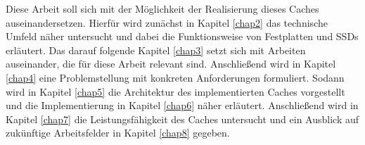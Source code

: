 Diese Arbeit soll sich mit der Möglichkeit der Realisierung dieses Caches auseinandersetzen. Hierfür wird zunächst in Kapitel \ref{chap2} das technische Umfeld
näher untersucht und dabei die Funktionsweise von Festplatten und \acp{SSD} erläutert. Das darauf folgende Kapitel \ref {chap3} setzt sich mit Arbeiten
auseinander, die für diese Arbeit relevant sind. Anschließend wird in Kapitel \ref{chap4} eine Problemstellung mit konkreten Anforderungen formuliert. Sodann
wird in Kapitel \ref{chap5} die Architektur des implementierten Caches vorgestellt und die Implementierung in Kapitel \ref{chap6} näher erläutert. Anschließend
wird in Kapitel \ref{chap7} die Leistungsfähigkeit des Caches untersucht und ein Ausblick auf zukünftige Arbeitsfelder in Kapitel \ref{chap8} gegeben.
